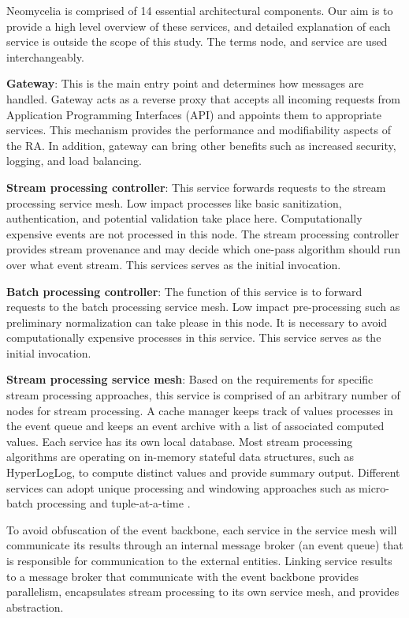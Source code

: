 \documentclass[conference]{IEEEtran}
\begin{document}
Neomycelia is comprised of 14 essential architectural components. Our aim is to provide a high level overview of these services, and detailed explanation of each service is outside the scope of this study. The terms node, and service are used interchangeably.

\textbf{Gateway}: This is the main entry point and determines how messages are handled. Gateway acts as a reverse proxy that accepts all incoming requests from Application Programming Interfaces (API) and appoints them to appropriate services. This mechanism provides the performance and modifiability aspects of the RA. In addition, gateway can bring other benefits such as increased security, logging, and load balancing.

\textbf{Stream processing controller}: This service forwards requests to the stream processing service mesh. Low impact processes like basic sanitization, authentication, and potential validation take place here. Computationally expensive events are not processed in this node. The stream processing controller provides stream provenance and may decide which one-pass algorithm should run over what event stream. This services serves as the initial invocation.

\textbf{Batch processing controller}: The function of this service is to forward requests to the batch processing service mesh. Low impact pre-processing such as preliminary normalization can take please in this node. It is necessary to avoid computationally expensive processes in this service. This service serves as the initial invocation.

\textbf{Stream processing service mesh}: Based on the requirements for specific stream processing approaches, this service is comprised of an arbitrary number of nodes for stream processing. A cache manager keeps track of values processes in the event queue and keeps an event archive with a list of associated computed values. Each service has its own local database. Most stream processing algorithms are operating on in-memory stateful data structures, such as HyperLogLog, to compute distinct values and provide summary output. Different services can adopt unique processing and windowing approaches such as micro-batch processing and tuple-at-a-time \cite{Sahal}.

To avoid obfuscation of the event backbone, each service in the service mesh will communicate its results through an internal message broker (an event queue) that is responsible for communication to the external entities. Linking service results to a message broker that communicate with the event backbone provides parallelism, encapsulates stream processing to its own service mesh, and provides abstraction.
\end{document}
